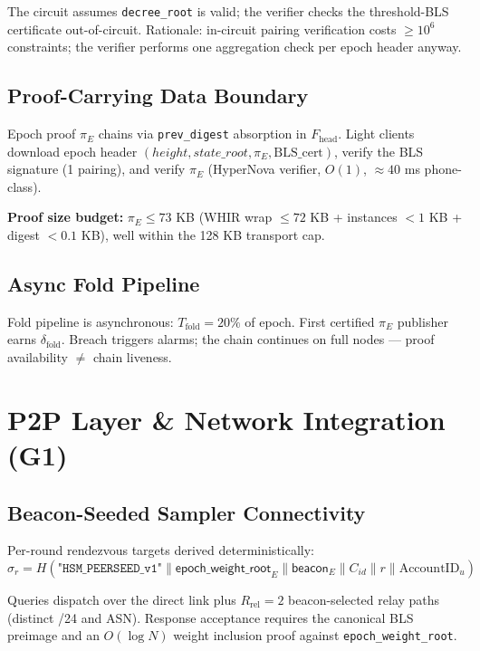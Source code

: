 \documentclass[11pt, a4paper]{article}
\begin{document}
The circuit assumes \texttt{decree\_root} is valid; the verifier checks the threshold-BLS certificate out-of-circuit. Rationale: in-circuit pairing verification costs $\ge 10^6$ constraints; the verifier performs one aggregation check per epoch header anyway.

\subsection{Proof-Carrying Data Boundary}

Epoch proof $\pi_E$ chains via \texttt{prev\_digest} absorption in $F_{\text{head}}$. Light clients download epoch header $(height, state\_root, \pi_E, \text{BLS\_cert})$, verify the BLS signature (1 pairing), and verify $\pi_E$ (HyperNova verifier, $O(1)$, $\approx 40$ ms phone-class).

\textbf{Proof size budget:} $\pi_E \le 73$ KB (WHIR wrap $\le 72$ KB + instances $< 1$ KB + digest $< 0.1$ KB), well within the 128 KB transport cap.

\subsection{Async Fold Pipeline}

Fold pipeline is asynchronous: $T_{\text{fold}} = 20\%$ of epoch. First certified $\pi_E$ publisher earns $\delta_{\text{fold}}$. Breach triggers alarms; the chain continues on full nodes --- proof availability $\neq$ chain liveness.

\section{P2P Layer \& Network Integration (G1)}

\subsection{Beacon-Seeded Sampler Connectivity}

Per-round rendezvous targets derived deterministically:
\begin{equation}
\sigma_r = H(\texttt{"HSM\_PEERSEED\_v1"} \| \textsf{epoch\_weight\_root}_E \| \textsf{beacon}_E \| C_{id} \| r \| \text{AccountID}_u)
\end{equation}

Queries dispatch over the direct link plus $R_{\text{rel}} = 2$ beacon-selected relay paths (distinct /24 and ASN). Response acceptance requires the canonical BLS preimage and an $O(\log N)$ weight inclusion proof against \texttt{epoch\_weight\_root}.
\end{document}

